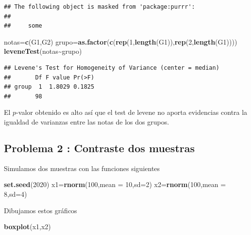 \documentclass[
]{article}
\newenvironment{Shaded}{\begin{snugshade}}{\end{snugshade}}
\newcommand{\DataTypeTok}[1]{\textcolor[rgb]{0.13,0.29,0.53}{#1}}
\newcommand{\DecValTok}[1]{\textcolor[rgb]{0.00,0.00,0.81}{#1}}
\newcommand{\KeywordTok}[1]{\textcolor[rgb]{0.13,0.29,0.53}{\textbf{#1}}}
\newcommand{\NormalTok}[1]{#1}
\newcommand{\OperatorTok}[1]{\textcolor[rgb]{0.81,0.36,0.00}{\textbf{#1}}}
\begin{document}
\begin{verbatim}
## The following object is masked from 'package:purrr':
## 
##     some
\end{verbatim}

\begin{Shaded}
\begin{Highlighting}[]
\NormalTok{notas=}\KeywordTok{c}\NormalTok{(G1,G2)}
\NormalTok{grupo=}\KeywordTok{as.factor}\NormalTok{(}\KeywordTok{c}\NormalTok{(}\KeywordTok{rep}\NormalTok{(}\DecValTok{1}\NormalTok{,}\KeywordTok{length}\NormalTok{(G1)),}\KeywordTok{rep}\NormalTok{(}\DecValTok{2}\NormalTok{,}\KeywordTok{length}\NormalTok{(G1))))}
\KeywordTok{leveneTest}\NormalTok{(notas}\OperatorTok{\textasciitilde{}}\NormalTok{grupo)}
\end{Highlighting}
\end{Shaded}

\begin{verbatim}
## Levene's Test for Homogeneity of Variance (center = median)
##       Df F value Pr(>F)
## group  1  1.8029 0.1825
##       98
\end{verbatim}

El \(p\)-valor obtenido es alto así que el test de levene no aporta
evidencias contra la igualdad de varianzas entre las notas de los dos
grupos.

\hypertarget{problema-2-contraste-dos-muestras}{%
\subsection{Problema 2 : Contraste dos
muestras}\label{problema-2-contraste-dos-muestras}}

Simulamos dos muestras con las funciones siguientes

\begin{Shaded}
\begin{Highlighting}[]
\KeywordTok{set.seed}\NormalTok{(}\DecValTok{2020}\NormalTok{)}
\NormalTok{x1=}\KeywordTok{rnorm}\NormalTok{(}\DecValTok{100}\NormalTok{,}\DataTypeTok{mean =} \DecValTok{10}\NormalTok{,}\DataTypeTok{sd=}\DecValTok{2}\NormalTok{)}
\NormalTok{x2=}\KeywordTok{rnorm}\NormalTok{(}\DecValTok{100}\NormalTok{,}\DataTypeTok{mean =} \DecValTok{8}\NormalTok{,}\DataTypeTok{sd=}\DecValTok{4}\NormalTok{)}
\end{Highlighting}
\end{Shaded}

Dibujamos estos gráficos

\begin{Shaded}
\begin{Highlighting}[]
\KeywordTok{boxplot}\NormalTok{(x1,x2)}
\end{Highlighting}
\end{Shaded}
\end{document}
